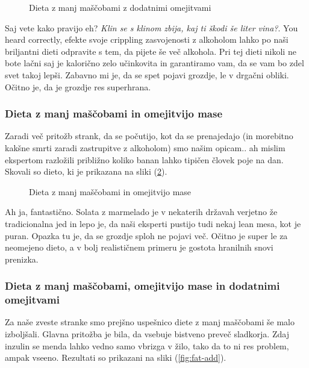 \documentclass[a4paper]{article}
\begin{document}
\begin{figure}[H]
    \centering
    \caption{Dieta z manj maščobami z dodatnimi omejitvami}
    \label{fig:fat-add-no-mass}
\end{figure}

Saj vete kako pravijo eh? \textit{Klin se s klinom zbija, kaj ti škodi še liter vina?}. You heard 
correctly, efekte svoje crippling zasvojenosti z alkoholom lahko po naši briljantni dieti odpravite
s tem, da pijete še več alkohola. Pri tej dieti nikoli ne bote lačni saj je kalorično zelo učinkovita 
in garantiramo vam, da se vam bo zdel svet takoj lepši. Zabavno mi je, da se spet pojavi grozdje, le 
v drgačni obliki. Očitno je, da je grozdje res superhrana.\\

\subsubsection{Dieta z manj maščobami in omejitvijo mase}
Zaradi več pritožb strank, da se počutijo, kot da se prenajedajo (in morebitno kakšne smrti zaradi
zastrupitve z alkoholom) smo našim opicam.. ah mislim ekspertom razložili približno koliko banan lahko
tipičen človek poje na dan. Skovali so dieto, ki je prikazana na sliki (\ref{fig:fat}). \\

\begin{figure}
    \centering
    \caption{Dieta z manj maščobami in omejitvijo mase}
    \label{fig:fat}
\end{figure}

Ah ja, fantastično. Solata z marmelado je v nekaterih državah verjetno že tradicionalna jed in lepo je, 
da naši eksperti pustijo tudi nekaj lean mesa, kot je puran. Opazka tu je, da se grozdje sploh ne pojavi več.
Očitno je super le za neomejeno dieto, a v bolj realističnem primeru je gostota hranilnih snovi prenizka. \\

\subsubsection{Dieta z manj maščobami, omejitvijo mase in dodatnimi omejitvami}
Za naše zveste stranke smo prejšno uspešnico diete z manj maščobami še malo izboljšali. Glavna pritožba
je bila, da vsebuje bistveno preveč sladkorja. Zdaj inzulin se menda lahko vedno samo vbrizga v žilo,
tako da to ni res problem, ampak vseeno. Rezultati so prikazani na sliki (\ref{fig:fat-add}). \\
\end{document}
